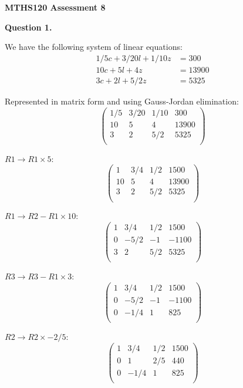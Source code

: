 \documentclass[12pt,a4paper]{report}
\begin{document}
\textbf{MTHS120 Assessment 8}

\textbf{Question 1.}

We have the following system of linear equations:
\begin{align*}
 1/5c + 3/20l + 1/10z &= 300 \\
  10c +    5l +    4z &= 13900 \\
   3c +    2l +  5/2z  &= 5325
\end{align*} 

Represented in matrix form and using Gauss-Jordan elimination:
 \[
 \left(\begin{array}{rrr|r}
   1/5 & 3/20 & 1/10 & 300  \\
   10  & 5    & 4    & 13900  \\
   3   & 2    & 5/2  & 5325  \\ 
   \end{array} \right)
\]

\( R1 \rightarrow R1 \times 5 \):
 \[
 \left(\begin{array}{rrr|r}
   1   & 3/4  & 1/2  & 1500  \\
   10  & 5    & 4    & 13900  \\
   3   & 2    & 5/2  & 5325  \\ 
   \end{array} \right)
\]

\( R1 \rightarrow R2 - R1 \times 10 \):
 \[
 \left(\begin{array}{rrr|r}
   1   & 3/4  & 1/2  & 1500  \\
   0   & -5/2 & -1   & -1100  \\
   3   & 2    & 5/2  & 5325  \\ 
   \end{array} \right)
\]

\( R3 \rightarrow R3 - R1 \times 3 \):
 \[
 \left(\begin{array}{rrr|r}
   1   & 3/4  & 1/2  & 1500  \\
   0   & -5/2 & -1   & -1100  \\
   0   & -1/4 & 1    & 825  \\ 
   \end{array} \right)
\]

\( R2 \rightarrow R2 \times -2/5 \):
 \[
 \left(\begin{array}{rrr|r}
   1   & 3/4  & 1/2  & 1500  \\
   0   & 1    & 2/5  & 440  \\
   0   & -1/4 & 1    & 825  \\ 
   \end{array} \right)
\]
\end{document}
